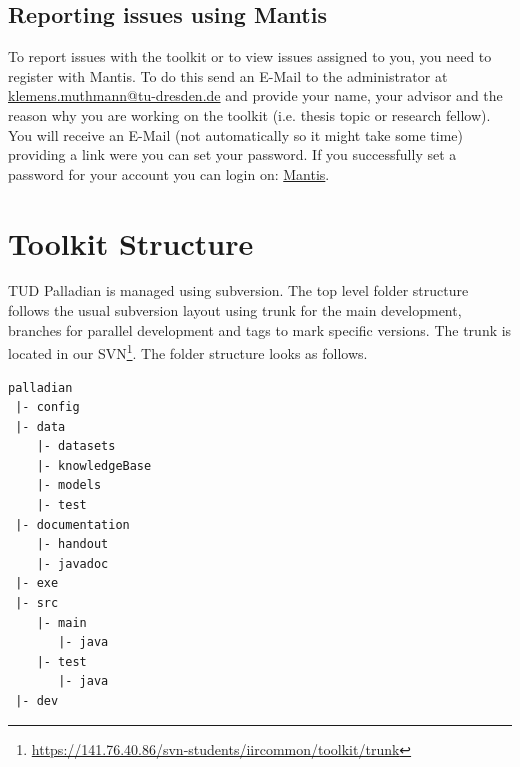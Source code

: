 \documentclass[a4paper,twoside]{book}      %
\begin{document}
\section{Reporting issues using Mantis}
To report issues with the toolkit or to view issues assigned to you, you need to register with Mantis. To do this send an E-Mail to the administrator at \href{mailto:klemens.muthmann@tu-dresden.de}{klemens.muthmann@tu-dresden.de} and provide your name, your advisor and the reason why you are working on the toolkit (i.e. thesis topic or research fellow). You will receive an E-Mail (not automatically so it might take some time) providing a link were you can set your password. If you successfully set a password for your account you can login on: \href{http://141.76.40.242/mantisbt}{Mantis}.

\chapter{Toolkit Structure}
\label{sec:toolkitstructure}
TUD Palladian is managed using subversion. The top level folder structure follows the usual subversion layout using trunk for the main development, branches for parallel development and tags to mark specific versions. The trunk is located in our SVN\footnote{\url{https://141.76.40.86/svn-students/iircommon/toolkit/trunk}}. The folder structure looks as follows.
\begin{verbatim}
palladian
 |- config
 |- data
    |- datasets
    |- knowledgeBase
    |- models
    |- test
 |- documentation
    |- handout
    |- javadoc
 |- exe
 |- src
    |- main
       |- java
    |- test
       |- java
 |- dev
\end{verbatim}
\end{document}
